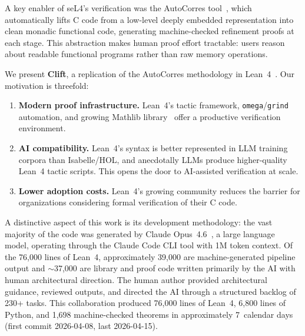 \documentclass[sigconf,nonacm,screen]{acmart}
\begin{document}
A key enabler of seL4's verification was the AutoCorres
tool~\cite{greenaway2014autocorres}, which automatically lifts C code
from a low-level deeply embedded representation into clean monadic
functional code, generating machine-checked refinement proofs
at each stage. This abstraction makes human proof effort tractable:
users reason about readable functional programs rather than raw memory
operations.

We present \textbf{Clift}, a replication of the AutoCorres methodology
in Lean~4~\cite{demoura2021lean4}. Our motivation is threefold:

\begin{enumerate}
\item \textbf{Modern proof infrastructure.} Lean~4's tactic framework,
  \texttt{omega}/\texttt{grind} automation, and growing Mathlib
  library~\cite{mathlib2020} offer a productive verification
  environment.
\item \textbf{AI compatibility.} Lean~4's syntax is better
  represented in LLM training corpora than Isabelle/HOL, and
  anecdotally LLMs produce higher-quality Lean~4 tactic scripts.
  This opens the door to AI-assisted verification at scale.
\item \textbf{Lower adoption costs.} Lean~4's growing community
  reduces the barrier for organizations considering formal verification
  of their C code.
\end{enumerate}

A distinctive aspect of this work is its development methodology:
the vast majority of the code was generated by Claude
Opus~4.6~\cite{anthropic2025claude}, a large language model, operating
through the Claude Code CLI tool with 1M token context. Of the 76,000
lines of Lean~4, approximately 39,000 are machine-generated pipeline
output and $\sim$37,000 are library and proof code written primarily by
the AI with human architectural direction. The human
author provided architectural guidance, reviewed outputs, and directed
the AI through a structured backlog of 230+ tasks. This collaboration
produced 76,000 lines of Lean~4, 6,800 lines of Python, and
1,698 machine-checked theorems in approximately 7~calendar days
(first commit 2026-04-08, last 2026-04-15).
\end{document}
